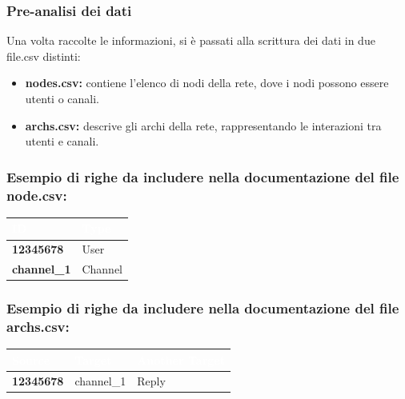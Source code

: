 \documentclass[12pt]{article}
\begin{document}
	\subsubsection{Pre-analisi dei dati}
	Una volta raccolte le informazioni, si è passati alla scrittura dei dati in due file.csv distinti:
	\begin{itemize}[label=] 
		\item \textbf{nodes.csv:} contiene l'elenco di nodi della rete, dove i nodi possono essere utenti o canali.
		\item \textbf{archs.csv:} descrive gli archi della rete, rappresentando le interazioni tra utenti e canali.
	\end{itemize}
	\subsubsection{Esempio di righe da includere nella documentazione del file node.csv:}
	\begin{tabular}{|p{6cm}|p{8cm}|}
		\hline
		\cellcolor{darkblue}\textcolor{white}{\textbf{ID}} & \cellcolor{darkblue}\textcolor{white}{\textbf{Type}} \\
		\hline
		\textbf{12345678} & User \\
		\hline
		\textbf{channel\_1} & Channel\\
		\hline
	\end{tabular}
	\subsubsection{Esempio di righe da includere nella documentazione del file archs.csv:}
	\begin{tabular}{|p{5cm}|p{4cm}|p{4cm}|}
		\hline
		\cellcolor{darkblue}\textcolor{white}{\textbf{Source}} & 
		\cellcolor{darkblue}\textcolor{white}{\textbf{Target}} & 
		\cellcolor{darkblue}\textcolor{white}{\textbf{Another Target}} \\
		\hline
		\textbf{12345678} & channel\_1 & Reply \\
		\hline
	\end{tabular}
\end{document}
